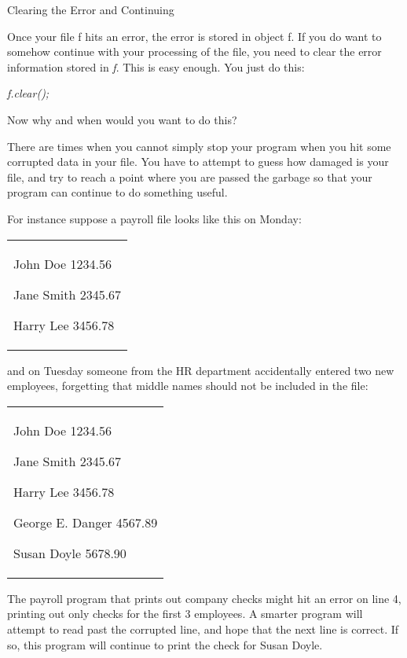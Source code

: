 \documentclass[
]{article}
\begin{document}
Clearing the Error and Continuing

Once your file f hits an error, the error is stored in object f. If you
do want to somehow continue with your processing of the file, you need
to clear the error information stored in \emph{f}. This is easy enough.
You just do this:

\emph{f.clear();}

Now why and when would you want to do this?

There are times when you cannot simply stop your program when you hit
some corrupted data in your file. You have to attempt to guess how
damaged is your file, and try to reach a point where you are passed the
garbage so that your program can continue to do something useful.

For instance suppose a payroll file looks like this on Monday:

\begin{longtable}[]{@{}
  >{\raggedright\arraybackslash}p{}@{}}
\toprule\noalign{}
 \\
\midrule\noalign{}
\endhead
\bottomrule\noalign{}
\endlastfoot
John Doe 1234.56

Jane Smith 2345.67

Harry Lee 3456.78 \\
\end{longtable}

and on Tuesday someone from the HR department accidentally entered two
new employees, forgetting that middle names should not be included in
the file:

\begin{longtable}[]{@{}
  >{\raggedright\arraybackslash}p{}@{}}
\toprule\noalign{}
 \\
\midrule\noalign{}
\endhead
\bottomrule\noalign{}
\endlastfoot
John Doe 1234.56

Jane Smith 2345.67

Harry Lee 3456.78

George E. Danger 4567.89

Susan Doyle 5678.90 \\
\end{longtable}

The payroll program that prints out company checks might hit an error on
line 4, printing out only checks for the first 3 employees. A smarter
program will attempt to read past the corrupted line, and hope that the
next line is correct. If so, this program will continue to print the
check for Susan Doyle.
\end{document}

